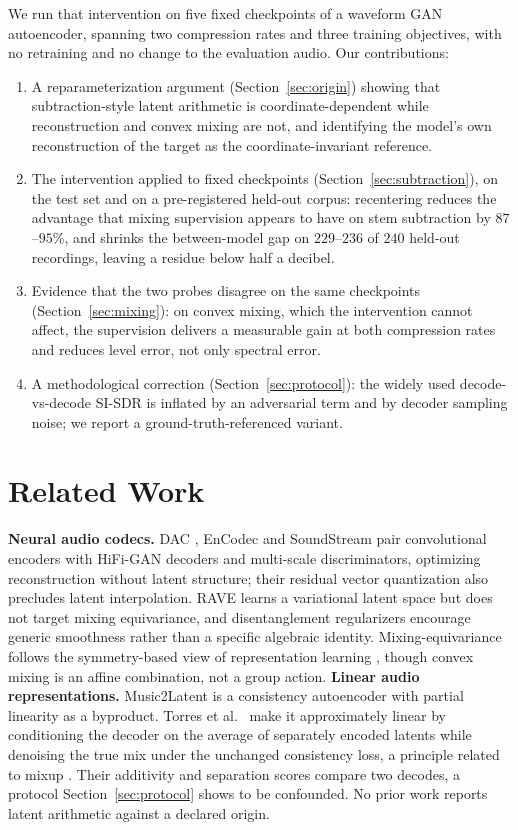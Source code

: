 \documentclass[conference]{IEEEtran}
\newcommand{\secref}[1]{Section~\ref{#1}}
\begin{document}
We run that intervention on five fixed checkpoints of a waveform GAN
autoencoder, spanning two compression rates and three training objectives,
with no retraining and no change to the evaluation audio. Our contributions:
\begin{enumerate}
  \item A reparameterization argument (\secref{sec:origin}) showing that
  subtraction-style latent arithmetic is coordinate-dependent while
  reconstruction and convex mixing are not, and identifying the model's own
  reconstruction of the target as the coordinate-invariant reference.
  \item The intervention applied to fixed checkpoints
(\secref{sec:subtraction}), on the test set and on a pre-registered held-out
corpus: recentering reduces the advantage that mixing supervision appears to have on
stem subtraction by $87$--$95$\%, and shrinks the between-model gap on
$229$--$236$ of $240$ held-out recordings, leaving a residue below half a
decibel.
  \item Evidence that the two probes disagree on the same checkpoints
  (\secref{sec:mixing}): on convex mixing, which the intervention cannot
  affect, the supervision delivers a measurable gain at both compression rates and
reduces level error, not only spectral error.
  \item A methodological correction (\secref{sec:protocol}): the widely used
decode-vs-decode SI-SDR is inflated by an adversarial term and by decoder
sampling noise; we report a ground-truth-referenced variant.
\end{enumerate}

\section{Related Work}\label{sec:related}
\textbf{Neural audio codecs.} DAC \cite{kumar2024dac},
EnCodec \cite{defossez2023encodec} and SoundStream \cite{zeghidour2022soundstream}
pair convolutional encoders with HiFi-GAN decoders \cite{kong2020hifigan} and
multi-scale discriminators, optimizing reconstruction without latent
structure; their residual vector quantization also precludes latent
interpolation. RAVE \cite{caillon2021rave} learns a variational latent space
but does not target mixing equivariance, and disentanglement regularizers
\cite{higgins2017betavae} encourage generic smoothness rather than a specific
algebraic identity.
Mixing-equivariance follows the symmetry-based view of representation
learning \cite{higgins2018towards}, though convex mixing is an affine
combination, not a group action. \textbf{Linear audio representations.} Music2Latent
\cite{pasini2024music2latent} is a consistency autoencoder with partial
linearity as a byproduct. Torres et al.~\cite{torres2026linearity} make it
approximately linear by conditioning the decoder on the average of separately
encoded latents while denoising the true mix under the unchanged consistency
loss, a principle related to mixup \cite{zhang2018mixup}. Their additivity and separation scores compare two decodes, a protocol
\secref{sec:protocol} shows to be confounded. No prior work reports latent
arithmetic against a declared origin.
\end{document}
